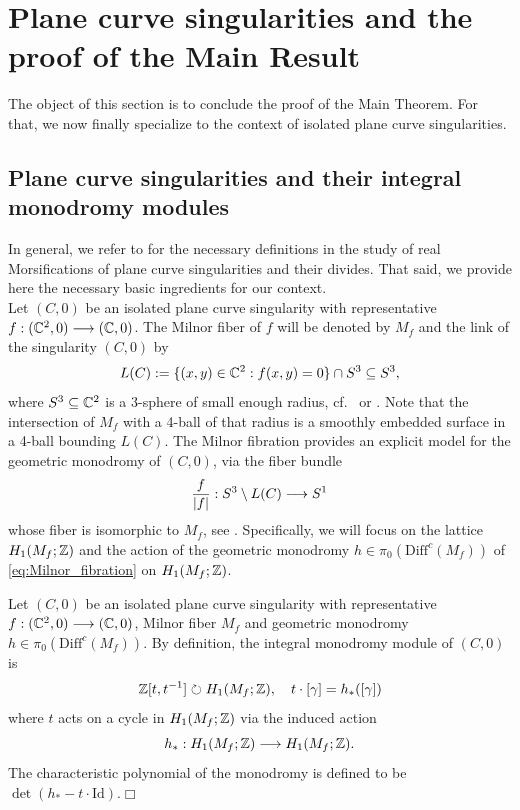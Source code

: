 \section{Plane curve singularities and the proof of the Main Result}\label{sec:proof_main}

The object of this section is to conclude the proof of the Main Theorem. For that, we now finally specialize to the context of isolated plane curve singularities.

\subsection{Plane curve singularities and their integral monodromy modules} In general, we refer to \cite{ACampo1998,ACampo1999,FPST} for the necessary definitions in the study of real Morsifications of plane curve singularities and their divides. That said, we provide here the necessary basic ingredients for our context.\\

Let $(C,0)$ be an isolated plane curve singularity with representative $f:(\mathbb C^2,0)\longrightarrow(\mathbb C,0)$. The Milnor fiber of $f$ will be denoted by $M_f$ and the link of the singularity $(C,0)$ by
$$L(C):=\{(x,y)\in\mathbb C^2:f(x,y)=0\}\cap S^3\subseteq S^3,$$
where $S^3\subseteq\mathbb C^2$ is a 3-sphere of small enough radius, cf.~\cite[Chapter 4]{milnor1968} or \cite[Chapter 4]{Seade19_MilnorFibration}. Note that the intersection of $M_f$ with a 4-ball of that radius is a smoothly embedded surface in a 4-ball bounding $L(C)$. The Milnor fibration provides an explicit model for the geometric monodromy of $(C,0)$, via the fiber bundle
\begin{equation}\label{eq:Milnor_fibration}
\frac{f}{|f|}:S^3\setminus L(C)\longrightarrow S^1
\end{equation}
whose fiber is isomorphic to $M_f$, see \cite[Theorem 4.8]{milnor1968}. Specifically, we will focus on the lattice $H_1(M_f;\mathbb Z)$ and the action of the geometric monodromy $h\in\pi_0(\mbox{Diff}^c(M_f))$ of \eqref{eq:Milnor_fibration} on $H_1(M_f;\mathbb Z)$.

\begin{definition}
Let $(C,0)$ be an isolated plane curve singularity with representative $f:(\mathbb C^2,0)\longrightarrow(\mathbb C,0)$, Milnor fiber $M_f$ and geometric monodromy $h\in\pi_0(\mbox{Diff}^c(M_f))$. By definition, the integral monodromy module of $(C,0)$ is
$$\mathbb Z[t,t^{-1}]\circlearrowright H_1(M_f;\mathbb Z),\quad t\cdot[\gamma]=h_*([\gamma])$$
where $t$ acts on a cycle in $H_1(M_f;\mathbb Z)$ via the induced action
$$h_*:H_1(M_f;\mathbb Z)\longrightarrow H_1(M_f;\mathbb Z).$$
The characteristic polynomial of the monodromy is defined to be $\det(h_*-t\cdot\mbox{Id})$.\hfill$\Box$
\end{definition}

